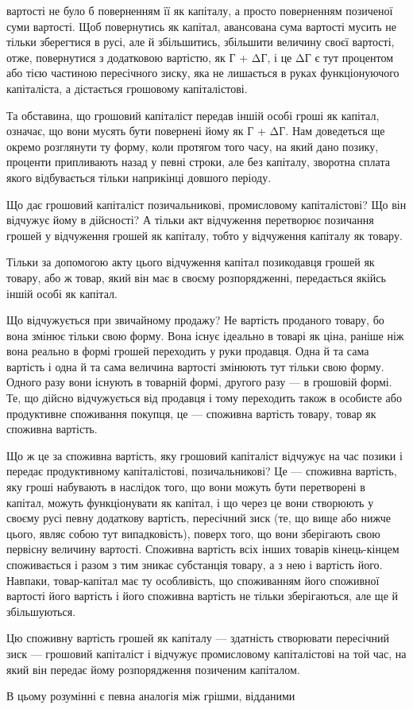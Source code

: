 \parcont{}  %
вартості не було б поверненням її як капіталу, а просто поверненням
позиченої суми вартості. Щоб повернутись як капітал,
авансована сума вартості мусить не тільки зберегтися в русі,
але й збільшитись, збільшити величину своєї вартості, отже,
повернутися з додатковою вартістю, як Г + ΔГ, і це ΔГ є тут
процентом або тією частиною пересічного зиску, яка не лишається
в руках функціонуючого капіталіста, а дістається грошовому капіталістові.

Та обставина, що грошовий капіталіст передав іншій особі
гроші як капітал, означає, що вони мусять бути повернені йому
як Г + ΔГ. Нам доведеться ще окремо розглянути ту форму, коли
протягом того часу, на який дано позику, проценти припливають
назад у певні строки, але без капіталу, зворотна сплата якого
відбувається тільки наприкінці довшого періоду.

Що дає грошовий капіталіст позичальникові, промисловому
капіталістові? Що він відчужує йому в дійсності? А тільки акт
відчуження перетворює позичання грошей у відчуження грошей
як капіталу, тобто у відчуження капіталу як товару.

Тільки за допомогою акту цього відчуження капітал позикодавця
грошей як товару, або ж товар, який він має в своєму
розпорядженні, передається якійсь іншій особі як капітал.

Що відчужується при звичайному продажу? Не вартість проданого
товару, бо вона змінює тільки свою форму. Вона існує ідеально
в товарі як ціна, раніше ніж вона реально в формі грошей
переходить у руки продавця. Одна й та сама вартість і одна й та
сама величина вартості змінюють тут тільки свою форму. Одного
разу вони існують в товарній формі, другого разу — в грошовій
формі. Те, що дійсно відчужується від продавця і тому переходить
також в особисте або продуктивне споживання покупця,
це — споживна вартість товару, товар як споживна вартість.

Що ж це за споживна вартість, яку грошовий капіталіст відчужує
на час позики і передає продуктивному капіталістові,
позичальникові? Це — споживна вартість, яку гроші набувають
в наслідок того, що вони можуть бути перетворені в капітал,
можуть функціонувати як капітал, і що через це вони створюють
у своєму русі певну додаткову вартість, пересічний зиск (те,
що вище або нижче цього, являє собою тут випадковість), поверх
того, що вони зберігають свою первісну величину вартості. Споживна
вартість всіх інших товарів кінець-кінцем споживається
і разом з тим зникає субстанція товару, а з нею і вартість його.
Навпаки, товар-капітал має ту особливість, що споживанням його
споживної вартості його вартість і його споживна вартість не
тільки зберігаються, але ще й збільшуються.

Цю споживну вартість грошей як капіталу — здатність створювати
пересічний зиск — грошовий капіталіст і відчужує промисловому
капіталістові на той час, на який він передає йому
розпорядження позиченим капіталом.

В цьому розумінні є певна аналогія між грішми, відданими
\parbreak{}  %
